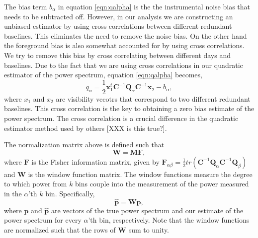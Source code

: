 \documentclass[twocolumn,numberedappendix]{emulateapj} \shorttitle{PSA64}
\newcommand{\x}{\mathbf{x}} \newcommand{\xhat}{\hat{\mathbf{x}}}
\begin{document}
The bias term $b_{\alpha}$ in equation \ref{eqn:qalpha} is the the instrumental
noise bias that needs to be subtracted off. However, in our analysis we are
constructing an unbiased estimator by using cross correlations between different
redundant baselines. This eliminates the need to remove the noise bias. On the
other hand the foreground bias is also somewhat accounted for by using cross
correlations. We try to remove this bias by cross correlating between different
days and baselines. Due to the fact that we are using cross correlations in our
quadratic estimator of the power spectrum, equation \ref{eqn:qalpha} becomes, 
\begin{equation}\label{eqn:qalpha_unbiased}
    q_{\alpha} =
\frac{1}{2}\x_{1}^{t}\mathbf{C}^{-1}\mathbf{Q}_{\alpha}\mathbf{C}^{-1}\x_{2} - b_{\alpha},
\end{equation}
where $x_{1}$ and $x_{2}$ are visibility vecotrs that correspond to two
different redundant baselines. This cross correlation is the key to obtaining a
zero bias estimate of the power spectrum. The cross correlation is a crucial
difference in the quadratic estimator method used by others [XXX is this
true?].

The normalization matrix above is defined such that
\begin{equation}\label{eqn:window_def}
    \mathbf{W} = \mathbf{M}\mathbf{F}, 
\end{equation}
where $\mathbf{F}$ is the Fisher information matrix, given by
$\mathbf{F}_{\alpha\beta} =
\frac{1}{2}tr(\mathbf{C}^{-1}\mathbf{Q}_{\alpha}\mathbf{C}^{-1}\mathbf{Q}_{\beta})$
and $\mathbf{W}$ is the window function matrix. The window functions measure the
degree to which power from $k$ bins couple into the measurement of the power
measured in the $\alpha$'th $k$ bin. Specifically, 
\begin{equation}\label{eqn:true_pspec_2_est_pspec}
    \hat{\mathbf{p}} = \mathbf{W}\mathbf{p}, 
\end{equation}
where $\mathbf{p}$ and $\hat{\mathbf{p}}$ are vectors of the true power spectrum and our
estimate of the power spectrum for every $\alpha$'th bin, respectively. Note
that the window functions are normalized such that the rows of $\mathbf{W}$ sum
to unity.
\end{document}
